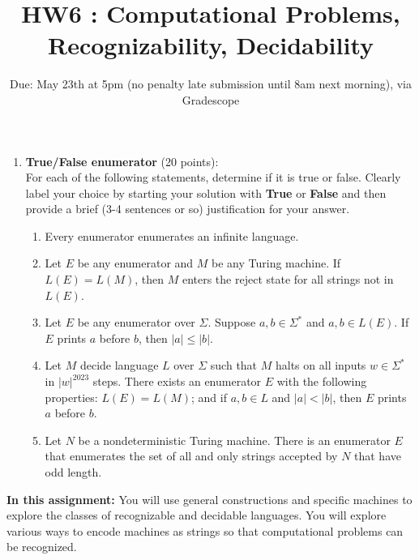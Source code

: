 \begin{enumerate}

\item \textbf{True/False enumerator} (20 points): \\
For each of the following statements, determine if it is true or false. 
Clearly label your choice 
by starting your solution with {\bf True} or {\bf False} and then
provide a brief (3-4 sentences or so) justification for your answer.
\begin{enumerate}
\item\gradeCorrect Every enumerator enumerates an infinite language.
\item\gradeCorrect Let $E$ be any enumerator and $M$ be any Turing machine.
If $L(E) = L(M)$, then $M$ enters the reject state for all strings not in $L(E)$.
\item\gradeCorrect Let $E$ be any enumerator over $\Sigma$.
Suppose $a, b \in \Sigma^*$ and $a, b \in L(E)$.
If $E$ prints $a$ before $b$, then $|a| \le |b|$.
\item\gradeCorrect Let $M$ decide language $L$ over $\Sigma$
such that $M$ halts on all inputs $w \in \Sigma^*$ in $|w|^{2023}$ steps. 
There exists an enumerator $E$ with the following properties: $L(E) = L(M)$; 
and if $a, b \in L$ and $|a| < |b|$, then $E$ prints $a$ before $b$.
\item\gradeCorrect Let $N$ be a nondeterministic Turing machine. 
There is an enumerator $E$ that enumerates the set of all and only 
strings accepted by $N$ that have odd length.

\end{enumerate}

\end{enumerate}

\newpage

\title{HW6 : Computational Problems, Recognizability, Decidability}
\date{Due: May 23th at 5pm (no penalty late submission until 8am next morning), via Gradescope}


\maketitle
\thispagestyle{fancy}

\textbf{In this assignment:} You will use general constructions and specific machines 
to explore the classes of recognizable and decidable languages. You will explore various 
ways to encode machines as strings so that computational problems can be recognized.

